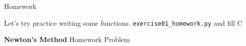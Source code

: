 \documentclass[a4paper]{article}
\begin{document}
\newpage
\begin{exam}[Homework]{Homework}
  \begin{instructions}
    Let's try practice writing some functions. \texttt{exercise01_homework.py}
    and fill C
  \end{instructions}

  \begin{problem}[3]{\textbf{Newton's Method}}
    Homework Problem
  \end{problem}
\end{exam}
\end{document}

